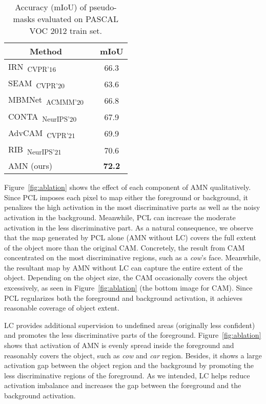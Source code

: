 \documentclass[10pt,twocolumn,letterpaper]{article}
\begin{document}
\begin{table}[t!]
\centering
{\small
\begin{tabular}{@{}lcc@{}}
\toprule
\multicolumn{1}{c}{Method}        &           & mIoU \\ \midrule
\multicolumn{1}{l}{IRN~\cite{ahn2019weakly}\textsubscript{CVPR'16}}     
            &  & 66.3 \\
\multicolumn{1}{l}{SEAM~\cite{wang2020self}\textsubscript{CVPR'20}}
            &  & 63.6 \\
\multicolumn{1}{l}{MBMNet~\cite{liu2020weakly}\textsubscript{ACMMM'20}}
            &  & 66.8 \\
\multicolumn{1}{l}{CONTA~\cite{zhang2020causal}\textsubscript{NeurIPS'20}}
            &  & 67.9 \\
\multicolumn{1}{l}{AdvCAM~\cite{lee2021anti}\textsubscript{CVPR'21}}
            &  & 69.9 \\ 
\multicolumn{1}{l}{RIB~\cite{lee2021reducing}\textsubscript{NeurIPS'21}}
            &  & 70.6 \\ \midrule
\multicolumn{1}{l}{AMN (ours)}
            &  & \textbf{72.2} \\ \bottomrule
\end{tabular}
}
\caption{Accuracy (mIoU) of pseudo-masks evaluated on PASCAL VOC 2012 train set.}
\label{tab:mask}
\vspace{-5mm}
\end{table} 
 Figure~\ref{fig:ablation} shows the effect of each component of AMN qualitatively. Since PCL imposes each pixel to map either the foreground or background, it penalizes the high activation in the most discriminative parts as well as the noisy activation in the background. Meanwhile, PCL can increase the moderate activation in the less discriminative part. As a natural consequence, we observe that the map generated by PCL alone (AMN without LC) covers the full extent of the object more than the original CAM. Concretely, the result from CAM concentrated on the most discriminative regions, such as a \textit{cow}'s face. Meanwhile, the resultant map by AMN without LC can capture the entire extent of the object. Depending on the object size, the CAM occasionally covers the object excessively, as seen in Figure~\ref{fig:ablation} (the bottom image for CAM). Since PCL regularizes both the foreground and background activation, it achieves reasonable coverage of object extent.  

LC provides additional supervision to undefined areas (originally less confident) and promotes the less discriminative parts of the foreground. Figure~\ref{fig:ablation} shows that activation of AMN is evenly spread inside the foreground and reasonably covers the object, such as \textit{cow} and \textit{car} region. Besides, it shows a large activation gap between the object region and the background by promoting the less discriminative regions of the foreground. As we intended, LC helps reduce activation imbalance and increases the gap between the foreground and the background activation.
\end{document}

